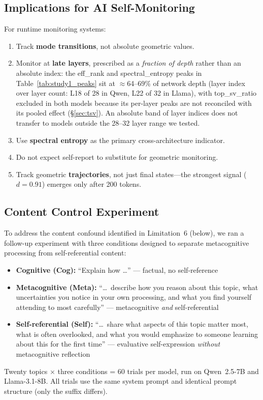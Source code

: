 \documentclass[11pt,a4paper]{article}
\begin{document}
\subsection{Implications for AI Self-Monitoring}

For runtime monitoring systems:

\begin{enumerate}[nosep]
    \item Track \textbf{mode transitions}, not absolute geometric values.
    \item Monitor at \textbf{late layers}, prescribed as a \emph{fraction of
          depth} rather than an absolute index: the eff\_rank and
          spectral\_entropy peaks in Table~\ref{tab:study1_peaks} sit at
          $\approx$64--69\% of network depth (layer index over layer count:
          L18 of 28 in Qwen, L22 of 32 in Llama), with top\_sv\_ratio
          excluded in both models because its per-layer peaks are not
          reconciled with its pooled effect (\S\ref{sec:tsv}). An absolute
          band of layer indices does not transfer to models outside the
          28--32 layer range we tested.
    \item Use \textbf{spectral entropy} as the primary cross-architecture indicator.
    \item Do not expect self-report to substitute for geometric monitoring.
    \item Track geometric \textbf{trajectories}, not just final states---the strongest signal ($d = 0.91$) emerges only after 200 tokens.
\end{enumerate}

\subsection{Content Control Experiment}
\label{sec:content_control}

To address the content confound identified in Limitation~6 (below), we ran a
follow-up experiment with three conditions designed to separate metacognitive
processing from self-referential content:
\begin{itemize}[nosep]
    \item \textbf{Cognitive (Cog):} ``Explain how \ldots'' --- factual, no self-reference
    \item \textbf{Metacognitive (Meta):} ``\ldots\ describe how you reason about this topic, what uncertainties you notice in your own processing, and what you find yourself attending to most carefully'' --- metacognitive \emph{and} self-referential
    \item \textbf{Self-referential (Self):} ``\ldots\ share what aspects of this topic matter most, what is often overlooked, and what you would emphasize to someone learning about this for the first time'' --- evaluative self-expression \emph{without} metacognitive reflection
\end{itemize}
Twenty topics $\times$ three conditions = 60 trials per model, run on
Qwen~2.5-7B and Llama-3.1-8B. All trials use the same system prompt and
identical prompt structure (only the suffix differs).
\end{document}
